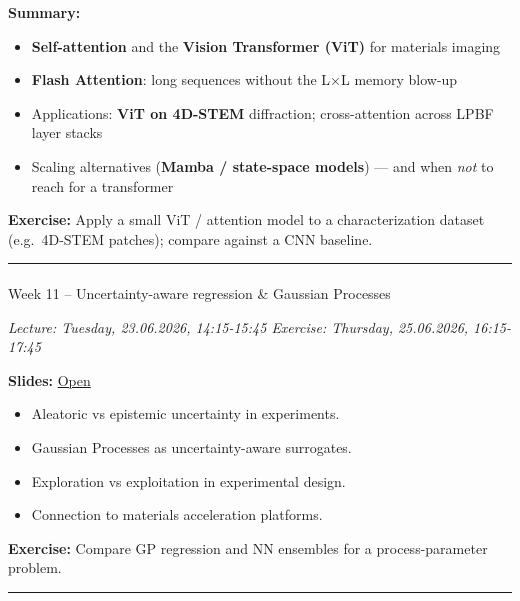 \documentclass[
]{agujournal2019}
\makeatletter
\let\oldparagraph\paragraph
\renewcommand{\paragraph}{
    \@ifstar
      \xxxParagraphStar
      \xxxParagraphNoStar
  }
\newcommand{\xxxParagraphStar}[1]{\oldparagraph*{#1}\mbox{}}
\newcommand{\xxxParagraphNoStar}[1]{\oldparagraph{#1}\mbox{}}
\providecommand{\tightlist}{%
  \setlength{\itemsep}{0pt}\setlength{\parskip}{0pt}}
\makeatother
\begin{document}
\textbf{Summary:}

\begin{itemize}
\tightlist
\item
  \textbf{Self-attention} and the \textbf{Vision Transformer (ViT)} for
  materials imaging
\item
  \textbf{Flash Attention}: long sequences without the L×L memory
  blow-up
\item
  Applications: \textbf{ViT on 4D-STEM} diffraction; cross-attention
  across LPBF layer stacks
\item
  Scaling alternatives (\textbf{Mamba / state-space models}) --- and
  when \emph{not} to reach for a transformer
\end{itemize}

\textbf{Exercise:} Apply a small ViT / attention model to a
characterization dataset (e.g.~4D-STEM patches); compare against a CNN
baseline.

\begin{center}\rule{0.5\linewidth}{0.5pt}\end{center}

\paragraph{Week 11 -- Uncertainty-aware regression \& Gaussian
Processes}\label{week-11-uncertainty-aware-regression-gaussian-processes}

\emph{Lecture: Tuesday, 23.06.2026, 14:15-15:45 \textbar{} Exercise:
Thursday, 25.06.2026, 16:15-17:45}

\textbf{Slides:}
\href{https://pelzlab.science/public_presentations/ml_for_characterization_and_processing/unit11_uncertainty_gp/12_uncertainty_gp.html}{Open}

\begin{itemize}
\tightlist
\item
  Aleatoric vs epistemic uncertainty in experiments.
\item
  Gaussian Processes as uncertainty-aware surrogates.
\item
  Exploration vs exploitation in experimental design.
\item
  Connection to materials acceleration platforms.
\end{itemize}

\textbf{Exercise:} Compare GP regression and NN ensembles for a
process-parameter problem.

\begin{center}\rule{0.5\linewidth}{0.5pt}\end{center}
\end{document}
